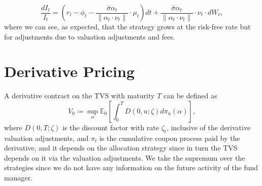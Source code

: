 \documentclass[11pt]{article}
\begin{document}
\begin{equation}
     \frac{dI_t}{I_t} = \left(r_t -  \phi_t     - \frac{\bar{\sigma} \alpha_t}{\|\alpha_t \cdot \nu_t \|}  \cdot \mu_t \right)dt+ \frac{\bar{\sigma}\alpha_t }{\|\alpha_t \cdot \nu_t \|} \cdot \nu_t \cdot dW_t,
\label{eq:TVS_last}\end{equation}
where we can see, as expected, that the strategy grows at the risk-free rate but for adjustments due to valuation adjustments and fees.
\section{Derivative Pricing}\label{sec:Derivative}
A derivative contract on the TVS with maturity $T$ can be defined as
\begin{equation}
    V_0 \coloneqq \sup_\alpha \mathbb{E}_0\left[\int_0^T D(0,u;\zeta)d\pi_u(\alpha)\right],
\end{equation}
where $D(0,T;\zeta)$ is the discount factor with rate $\zeta_t$, inclusive of the derivative valuation adjustments, and $\pi_t$ is the cumulative coupon process paid by the derivative, and it depends on the allocation strategy since in turn the TVS depends on it via the valuation adjustments. We take the supremum over the strategies since we do not have any information on the future activity of the fund manager.
\end{document}
